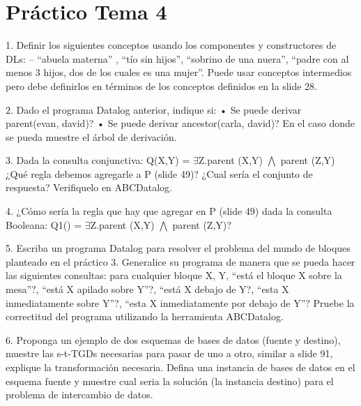\chapter{Práctico Tema 4}

1. Definir los siguientes conceptos usando los componentes y constructores de DLs: – “abuela materna” , “tío sin hijos”, “sobrino de una nuera”, “padre con al menos 3 hijos, dos de los cuales es una mujer”. Puede usar conceptos intermedios pero debe definirlos en términos de los conceptos definidos en la slide 28. 

2. Dado el programa Datalog anterior, indique si: • Se puede derivar parent(evan, david)? • Se puede derivar ancestor(carla, david)? En el caso donde se pueda muestre el árbol de derivación. 

3. Dada la consulta conjunctiva: Q(X,Y) = $\exists$Z.parent (X,Y) $\bigwedge$ parent (Z,Y) ¿Qué regla debemos agregarle a P (slide 49)? ¿Cual sería el conjunto de respuesta? Verifiquelo en ABCDatalog.

4. ¿Cómo sería la regla que hay que agregar en P (slide 49) dada la consulta Booleana: Q1() = $\exists$Z.parent (X,Y) $\bigwedge$ parent (Z,Y)? 

5. Escriba un programa Datalog para resolver el problema del mundo de bloques planteado en el práctico 3. Generalice su programa de manera que se pueda hacer las siguientes consultas: para cualquier bloque X, Y, “está el bloque X sobre la mesa”?, “está X apilado sobre Y”?, “está X debajo de Y?, “esta X inmediatamente sobre Y”?, “esta X inmediatamente por debajo de Y”? Pruebe la correctitud del programa utilizando la herramienta ABCDatalog. 

6. Proponga un ejemplo de dos esquemas de bases de datos (fuente y destino), muestre las s-t-TGDs necesarias para pasar de uno a otro, similar a slide 91, explique la transformación necesaria. Defina una instancia de bases de datos en el esquema fuente y muestre cual seria la solución (la instancia destino) para el problema de intercambio de datos.

\bigskip